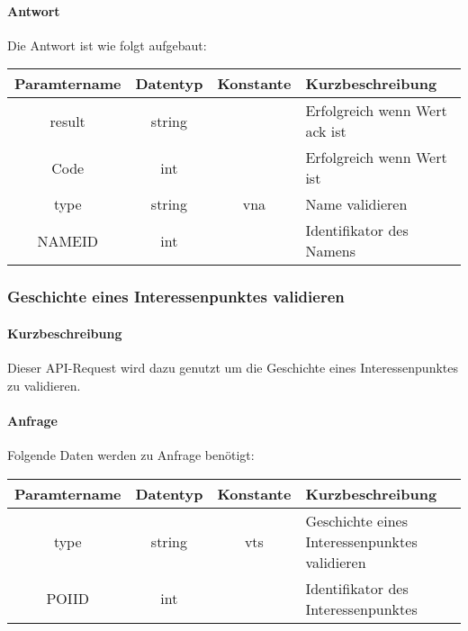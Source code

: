 \paragraph{Antwort}Die Antwort ist wie folgt aufgebaut:
\begin{table}[H]
	\begin{tabular}{|c|c|c|p{6.5cm}|}
		\hline
		\textbf{Paramtername} & \textbf{Datentyp} & \textbf{Konstante} & \textbf{Kurzbeschreibung}                                                                                               \\ \hline
		result              & string           &                 & Erfolgreich wenn Wert {\glqq ack\grqq} ist \\ \hline
		Code                & int              &                 & Erfolgreich wenn Wert {\glqq 0\grqq} ist \\ \hline
		type                & string           & vna             & Name validieren \\ \hline
		NAMEID              & int              &                 & Identifikator des Namens \\ \hline
	\end{tabular}
\end{table}
\subsubsection{Geschichte eines Interessenpunktes validieren}
\paragraph{Kurzbeschreibung}Dieser API-Request wird dazu genutzt um die Geschichte eines Interessenpunktes zu validieren.
\paragraph{Anfrage}Folgende Daten werden zu Anfrage benötigt:
\begin{table}[H]
	\begin{tabular}{|c|c|c|p{6.5cm}|}
		\hline
		\textbf{Paramtername} & \textbf{Datentyp} & \textbf{Konstante} & \textbf{Kurzbeschreibung}                                                                                               \\ \hline
		type                & string            & vts                & Geschichte eines Interessenpunktes validieren \\ \hline
		POIID               & int               &                    & Identifikator des Interessenpunktes \\ \hline
	\end{tabular}
\end{table}
